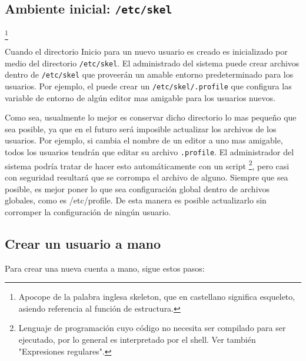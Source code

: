 \documentclass[12pt]{article}
\begin{document}
\subsection{Ambiente inicial: \texttt{/etc/skel}}
 	\footnote{ Apocope de la palabra inglesa
 	skeleton, que en castellano significa esqueleto, asiendo referencia al función
 de estructura.}

Cuando el directorio Inicio para un nuevo usuario es creado es
inicializado por medio del directorio \texttt{/etc/skel}. El
administrado del sistema puede crear archivos dentro de
\texttt{/etc/skel} que proveerán un amable entorno predeterminado
para los usuarios. Por ejemplo, el puede crear un
\texttt{/etc/skel/.profile} que configura  las variable de entorno
de algún editor mas amigable para los usuarios nuevos.


Como sea, usualmente lo mejor es conservar dicho directorio lo mas pequeño
que sea posible, ya que en el futuro será imposible actualizar los archivos de
los usuarios. Por ejemplo, si cambia el nombre de un editor a uno mas amigable,
todos los usuarios tendrán que editar su archivo  \texttt{.profile}.
El administrador del sistema podría tratar de hacer esto automáticamente con un
script \footnote{Lenguaje de programación cuyo código no necesita ser
compilado para ser ejecutado, por lo general es interpretado por el shell.
Ver también "Expresiones regulares".}, pero
	casi con seguridad resultará que se corrompa el archivo de
alguno.  Siempre que sea posible, es mejor poner lo que sea configuración global
dentro de archivos globales, como es /etc/profile. De esta manera es posible
actualizarlo sin corromper la configuración de ningún usuario.  






\subsection{Crear un usuario a mano}

Para crear una nueva cuenta a mano, sigue estos pasos:
\end{document}
